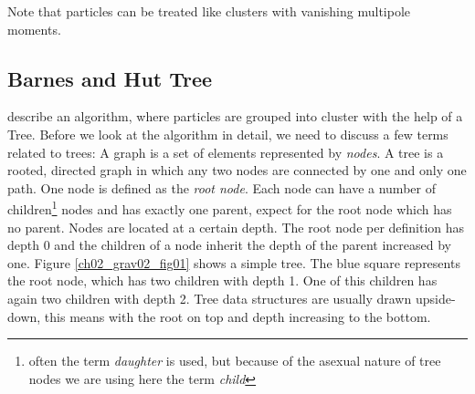 Note that particles can be treated like clusters with vanishing multipole moments.


\subsection{Barnes and Hut Tree}
\cite{Barnes:1986p2853} describe an algorithm, where particles are grouped into cluster with the help of a Tree. Before we look at the algorithm in detail, we need to discuss a few terms related to trees: A graph is a set of elements represented by \emph{nodes}. A tree is a rooted, directed graph in which any two nodes are connected by one and only one path. One node is defined as the \emph{root node}. Each node can have a number of children\footnote{often the term \emph{daughter} is used, but because of the asexual nature of tree nodes we are using here the term \emph{child}} nodes and has exactly one parent, expect for the root node which has no parent. Nodes are located at a certain depth. The root node per definition has depth $0$ and the children of a node inherit the depth of the parent increased by one. Figure \ref{ch02_grav02_fig01} shows a simple tree. The blue square represents the root node, which has two children with depth 1. One of this children has again two children with depth 2. Tree data structures are usually drawn upside-down, this means with the root on top and depth increasing to the bottom.

